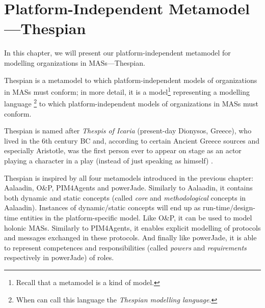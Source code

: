 
\chapter{Platform-Independent Metamodel---Thespian}

In this chapter, we will present our platform-independent metamodel for modelling organizations in MASs---Thespian.

Thespian is a metamodel to which platform-independent models of organizations in MASs must conform; in more detail, it is a model\footnote{Recall that a metamodel is a kind of model.} representing a modelling language \footnote{When can call this language the \textit{Thespian modelling language}.} to which platform-independent models of organizations in MASs must conform.

Thespian is named after \textit{Thespis of Icaria} (present-day Dionysos, Greece), who lived in the 6th century BC and, according to certain Ancient Greece sources and especially Aristotle, was the first person ever to appear on stage as an actor playing a character in a play (instead of just speaking as himself) \cite{Wikipedia-Thespis}.

Thespian is inspired by all four metamodels introduced in the previous chapter: Aalaadin, O\&P, PIM4Agents and powerJade.
Similarly to Aalaadin, it contains both dynamic and static concepts (called \textit{core} and \textit{methodological} concepts in Aalaadin).
Instances of dynamic/static concepts will end up as run-time/design-time entities in the platform-specific model.
Like O\&P, it can be used to model holonic MASs.
Similarly to PIM4Agents, it enables explicit modelling of protocols and messages exchanged in these protocols.
And finally like powerJade, it is able to represent competences and responsibilities (called \textit{powers} and \textit{requirements} respectively in powerJade) of roles.

